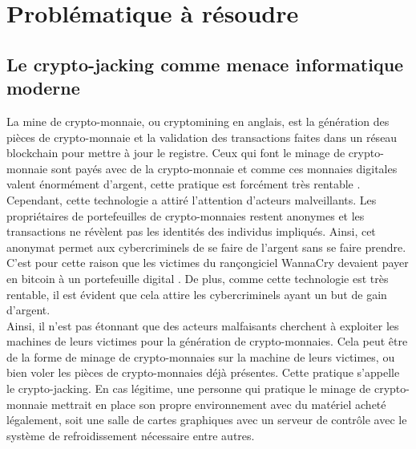 \section{Problématique à résoudre}
\subsection{Le crypto-jacking comme menace informatique moderne}
La mine de crypto-monnaie, ou cryptomining en anglais, est la génération des pièces de crypto-monnaie et la validation des transactions faites dans un réseau blockchain pour mettre à jour le registre. Ceux qui font le minage de crypto-monnaie sont payés avec de la crypto-monnaie et comme ces monnaies digitales valent énormément d'argent, cette pratique est forcément très rentable \cite{freeman2026mining}. \\
\newline
Cependant, cette technologie a attiré l'attention d'acteurs malveillants. Les propriétaires de portefeuilles de crypto-monnaies restent anonymes et les transactions ne révèlent pas les identités des individus impliqués. Ainsi, cet anonymat permet aux cybercriminels de se faire de l'argent sans se faire prendre. C'est pour cette raison que les victimes du rançongiciel WannaCry devaient payer en bitcoin à un portefeuille digital \cite{uptycs2026teamtnt}. De plus, comme cette technologie est très rentable, il est évident que cela attire les cybercriminels ayant un but de gain d'argent. \\
\newline
Ainsi, il n'est pas étonnant que des acteurs malfaisants cherchent à exploiter les machines de leurs victimes pour la génération de crypto-monnaies. Cela peut être de la forme de minage de crypto-monnaies sur la machine de leurs victimes, ou bien voler les pièces de crypto-monnaies déjà présentes. Cette pratique s'appelle le crypto-jacking. En cas légitime, une personne qui pratique le minage de crypto-monnaie mettrait en place son propre environnement avec du matériel acheté légalement, soit une salle de cartes graphiques avec un serveur de contrôle avec le système de refroidissement nécessaire entre autres. 
